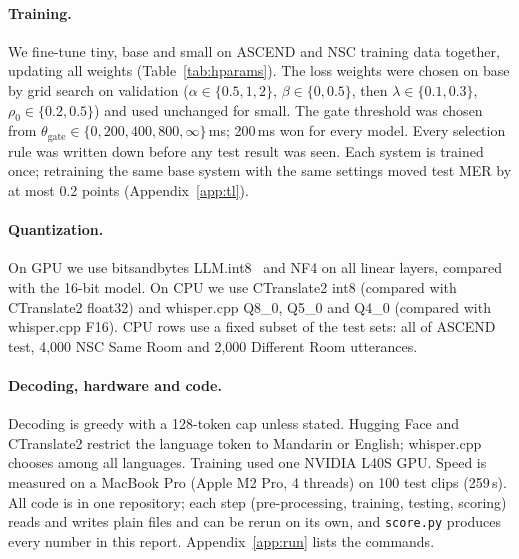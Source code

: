 \paragraph{Training.}
We fine-tune tiny, base and small on ASCEND and NSC training data together, updating all weights (Table~\ref{tab:hparams}). The loss weights were chosen on base by grid search on validation ($\alpha \in \{0.5,1,2\}$, $\beta \in \{0,0.5\}$, then $\lambda \in \{0.1,0.3\}$, $\rho_0 \in \{0.2,0.5\}$) and used unchanged for small. The gate threshold was chosen from $\theta_{\text{gate}} \in \{0, 200, 400, 800, \infty\}$\,ms; 200\,ms won for every model. Every selection rule was written down before any test result was seen. Each system is trained once; retraining the same base system with the same settings moved test MER by at most 0.2 points (Appendix~\ref{app:tl}).

\paragraph{Quantization.}
On GPU we use bitsandbytes LLM.int8~\citep{dettmers2022llmint8} and NF4 on all linear layers, compared with the 16-bit model. On CPU we use CTranslate2 int8 (compared with CTranslate2 float32) and whisper.cpp Q8\_0, Q5\_0 and Q4\_0 (compared with whisper.cpp F16). CPU rows use a fixed subset of the test sets: all of ASCEND test, 4{,}000 NSC Same Room and 2{,}000 Different Room utterances.

\paragraph{Decoding, hardware and code.}
Decoding is greedy with a 128-token cap unless stated. Hugging Face and CTranslate2 restrict the language token to Mandarin or English; whisper.cpp chooses among all languages. Training used one NVIDIA L40S GPU. Speed is measured on a MacBook Pro (Apple M2 Pro, 4 threads) on 100 test clips (259\,s). All code is in one repository; each step (pre-processing, training, testing, scoring) reads and writes plain files and can be rerun on its own, and \texttt{score.py} produces every number in this report. Appendix~\ref{app:run} lists the commands.
